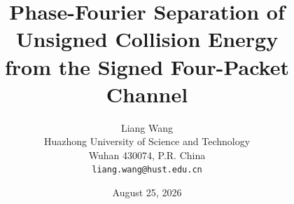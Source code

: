\documentclass[11pt]{article}
\title{Phase-Fourier Separation of Unsigned Collision Energy\\
from the Signed Four-Packet Channel}
\author{Liang Wang\\
Huazhong University of Science and Technology\\
Wuhan 430074, P.R. China\\
\texttt{liang.wang@hust.edu.cn}}
\date{August 25, 2026}
\begin{document}
\maketitle

\begin{abstract}

\end{abstract}













\appendix

\end{document}
